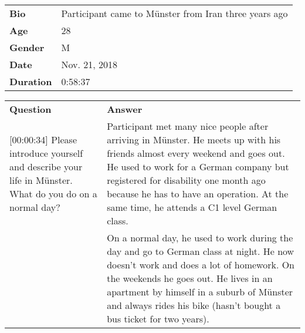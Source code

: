 \begin{longtable}{p{}p{}}
\textbf{Bio}      & Participant came to Münster from Iran three years ago \\
\textbf{Age}      & 28                                                    \\
\textbf{Gender}   & M                                                     \\
\textbf{Date}     & Nov. 21, 2018                                         \\
\textbf{Duration} & 0:58:37                                               \\
\end{longtable}

\renewcommand{\arraystretch}{1.5}

\begin{longtable}{p{}p{}}
\textbf{Question}                                                                                                                                               & \textbf{Answer}                                                                                                                                                                                                                                                                                                                                                                                                                                                                                                                                                                                 \\
{[}00:00:34{]} Please introduce yourself and describe your life in Münster. What do you do on a normal day?                                                     & Participant met many nice people after arriving in Münster. He meets up with his friends almost every weekend and goes out. He used to work for a German company but registered for disability one month ago because he has to have an operation. At the same time, he attends a C1 level German class.                                                                                                                                                                                                                                                                                         \\
                                                                                                                                                                & On a normal day, he used to work during the day and go to German class at night. He now doesn't work and does a lot of homework. On the weekends he goes out. He lives in an apartment by himself in a suburb of Münster and always rides his bike (hasn't bought a bus ticket for two years).                                                                                                                                                                                                                                                                                                  \\

\end{longtable}
